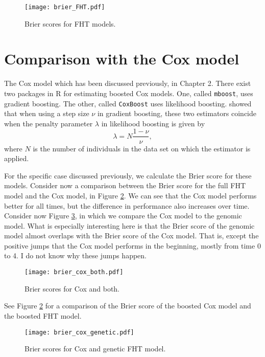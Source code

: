 \begin{figure}
\caption{Brier scores for FHT models.}
\label{fig:brier-FHT}
\centering\texttt{[image: brier\_FHT.pdf]}
\end{figure}

\section{Comparison with the Cox model}
The Cox model which has been discussed previously, in Chapter 2.
There exist two packages in R for estimating boosted Cox models.
One, called \verb|mboost|, uses gradient boosting.
The other, called \verb|CoxBoost| uses likelihood boosting.
\citet{DeBin2016} showed that when using a step size $\nu$ in gradient boosting, these two estimators coincide when the penalty parameter $\lambda$ in likelihood boosting is given by
\begin{equation}\label{eq:lambda-nu}
    \lambda=N\frac{1-\nu}{\nu},
\end{equation}
where $N$ is the number of individuals in the data set on which the estimator is applied.

For the specific case discussed previously, we calculate the Brier score for these models.
Consider now a comparison between the Brier score for the full FHT model and the Cox model, in Figure \ref{fig:brier-cox-both}.
We can see that the Cox model performs better for all times, but the difference in performance also increases over time.
Consider now Figure \ref{fig:brier-cox-genetic}, in which we compare the Cox model to the genomic model.
What is especially interesting here is that the Brier score of the genomic model almost overlaps with the Brier score of the Cox model.
That is, except the positive jumps that the Cox model performs in the beginning, mostly from time 0 to 4.
I do not know why these jumps happen.

\begin{figure}
\caption{Brier scores for Cox and both.}
\label{fig:brier-cox-both}
\centering\texttt{[image: brier\_cox\_both.pdf]}
\end{figure}
See Figure \ref{fig:brier-cox-both} for a comparison of the Brier score of the boosted Cox model and the boosted FHT model.
\begin{figure}
\caption{Brier scores for Cox and genetic FHT model.}
\label{fig:brier-cox-genetic}
\centering
\texttt{[image: brier\_cox\_genetic.pdf]}
\end{figure}

